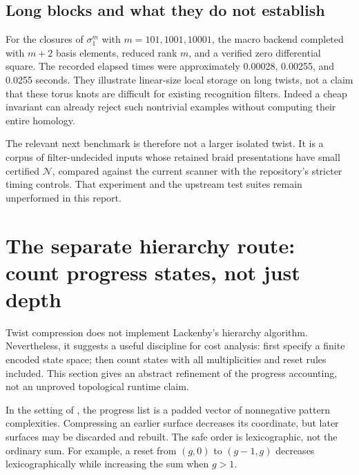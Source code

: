 \documentclass[11pt,letterpaper]{article}
\theoremstyle{definition}
\newcommand{\N}{\mathcal N}
\begin{document}
\subsection{Long blocks and what they do not establish}
For the closures of \(\sigma_1^m\) with \(m=101,1001,10001\), the macro backend completed with \(m+2\) basis elements, reduced rank \(m\), and a verified zero differential square. The recorded elapsed times were approximately 0.00028, 0.00255, and 0.0255 seconds. They illustrate linear-size local storage on long twists, not a claim that these torus knots are difficult for existing recognition filters. Indeed a cheap invariant can already reject such nontrivial examples without computing their entire homology.

The relevant next benchmark is therefore not a larger isolated twist. It is a corpus of filter-undecided inputs whose retained braid presentations have small certified \(\N\), compared against the current scanner with the repository's stricter timing controls. That experiment and the upstream test suites remain unperformed in this report.

\section{The separate hierarchy route: count progress states, not just depth}\label{sec:hierarchy}
Twist compression does not implement Lackenby's hierarchy algorithm. Nevertheless, it suggests a useful discipline for cost analysis: first specify a finite encoded state space; then count states with all multiplicities and reset rules included. This section gives an abstract refinement of the progress accounting, not an unproved topological runtime claim.

In the setting of \cite[Section 9]{lackenby26}, the progress list is a padded vector of nonnegative pattern complexities. Compressing an earlier surface decreases its coordinate, but later surfaces may be discarded and rebuilt. The safe order is lexicographic, not the ordinary sum. For example, a reset from \((g,0)\) to \((g-1,g)\) decreases lexicographically while increasing the sum when \(g>1\).
\end{document}
